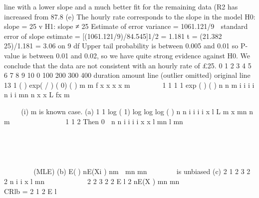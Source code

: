 \documentclass[a4paper,12pt]{article}
\begin{document}
line with a lower slope and a much better fit for the remaining data (R2
has increased from 87.8%
(e) The hourly rate corresponds to the slope in the model
H0: slope = 25 v H1: slope ≠ 25
Estimate of error variance = 1061.121/9
 standard error of slope estimate = [(1061.121/9)/84.545]1/2 = 1.181
t = (21.382  25)/1.181 = 	3.06 on 9 df
Upper tail probability is between 0.005 and 0.01 so P-value is between
0.01 and 0.02, so we have quite strong evidence against H0. We
conclude that the data are not consistent with an hourly rate of £25.
0 1 2 3 4 5 6 7 8 9 10
0
100
200
300
400
duration
amount
line (outlier omitted)
original line
13
1 ( ) exp( / ) ( 0)
( )
m
m
f x x x x
m
  
 
 
1 1
1
1
exp
( )
( )
n n m i i
i i n
i i mn n
x x
L fx
m
 


  
 
  	 
 

 


(i) m is known case.
(a) 1
1
log ( 1) log log log ( )
n
n i
i
i
i
x
l L m x mn n m 

      



1 1
2
Then 0 
n n
i i
i i
x x
l mn l
mn
   

  
 


   
 
(MLE)
(b) E() nE(Xi ) nm 
mn mn

    is unbiased
(c)
2
1
2 3 2 2
n
i
i
x
l mn  
  
  

2
2 3 2 2
E l 2 nE(X ) mn mn
  
       
 	  	 	 	
 CRlb =
2 1
2
E l
    
 		 
\end{document}
